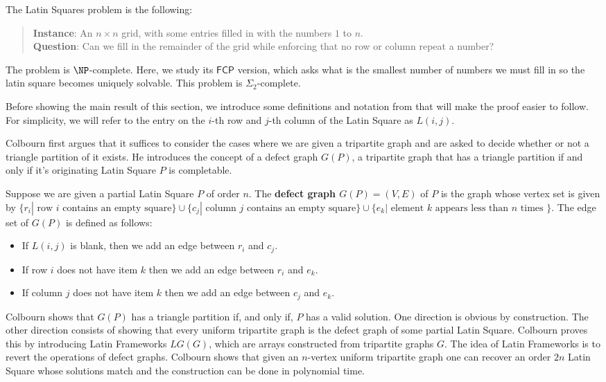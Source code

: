 \documentclass[runningheads,a4paper]{llncs}
\begin{document}
The Latin Squares problem is the following:
\begin{quote}
\textbf{Instance}: An $n \times n$ grid, with some entries filled in with the numbers $1$ to $n$.\\
\textbf{Question}: Can we fill in the remainder of the grid while enforcing that no row or column repeat a number?
\end{quote}
The problem is $\NP$-complete. Here, we study its  $\mathsf{FCP}$ version, which asks what is the smallest number of numbers we must fill in so the latin square becomes uniquely solvable. This problem is $\Sigma_2$-complete. 

Before showing the main result of this section, we introduce some definitions and notation from \cite{colbourn1984complexity} that will make the proof easier to follow. For simplicity, we will refer to the entry on the $i$-th row and $j$-th column of the Latin Square as $L(i,j)$. 

Colbourn \cite{colbourn1984complexity} first argues that it suffices to consider the cases where we are given a tripartite graph and are asked to decide whether or not a triangle partition of it exists. He introduces the concept of a defect graph $G(P)$, a tripartite graph that has a triangle partition if and only if it's originating Latin Square $P$ is completable. 

Suppose we are given a partial Latin Square $P$ of order $n$. The \textbf{defect graph $G(P) = (V,E)$} of $P$ is the graph whose vertex set is given by $\{ r_i | \text{ row } i \text{ contains an empty square} \} \cup \{ c_j | \text{ column } j \text{ contains an empty square} \} \cup \{ e_k | \text{ element } k\text{ appears less than } n \text{ times } \} $. The edge set of $G(P)$ is defined as follows: 

\begin{itemize}
	\item If $L(i,j)$ is blank, then we add an edge between $r_i$ and $c_j$. 
	\item If row $i$ does not have item $k$ then we add an edge between $r_i$ and $e_k$. 
	\item If column $j$ does not have item $k$ then we add an edge between $c_j$ and $e_k$.
\end{itemize}

Colbourn \cite{colbourn1984complexity} shows that $G(P)$ has a triangle partition if, and only if, $P$ has a valid solution. One direction is obvious by construction. The other direction  consists of showing that every uniform tripartite graph is the defect graph of some partial Latin Square. Colbourn \cite{colbourn1984complexity} proves this by introducing Latin Frameworks $LG(G)$, which are arrays constructed from tripartite graphs $G$. The idea of Latin Frameworks is to revert the operations of defect graphs. Colbourn shows  that given an $n$-vertex uniform tripartite graph one can recover an order $2n$ Latin Square whose solutions match and the construction can be done in polynomial time. 
\end{document}
